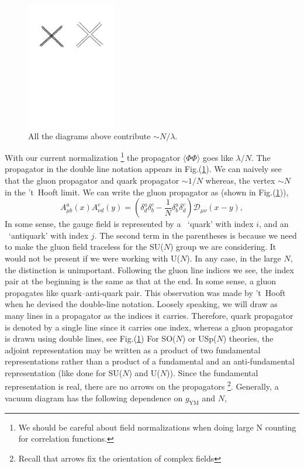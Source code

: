 \begin{figure}
\begin{center}\includegraphics[width=0.35\textwidth]{./Figures/DL3}\end{center}
\caption{\label{fig:dl2}All the diagrams above contribute $\sim N/\lambda$.}
\end{figure}

With our current normalization 
\footnote{We should be careful about field normalizations when doing large N counting for correlation functions. } 
the propagator $\langle \Phi \Phi \rangle$ goes like $\lambda/N$. The propagator in the 
double line notation appears in Fig.(\ref{fig:dl2}). 
We can naively see that the gluon propagator and quark propagator $ \sim 1/N$ 
whereas, the vertex $ \sim N$ in the 't~Hooft limit. 
We can write the gluon propagator as (shown in Fig.(\ref{fig:dl2})), 
\begin{equation}
\label{eq:gluon}
A^{a}_{\mu b}(x) A^{c}_{\nu d}(y) = \left ( \delta^{a}_{d}\delta^{c}_{b} - \frac{1}{N} \delta^{a}_{b}\delta^{c}_{d}\right)
\mathscr{D}_{\mu\nu}(x-y) , 
\end{equation}
In some sense, the gauge field is represented by a ~`quark' with index $i$, and an ~`antiquark' with index $j$. 
The second term in the parentheses is because we need to make the gluon field traceless for the SU($N$) group we are
considering. It would not be present if we were working with U($N$). In any case, in the large $N$, 
the distinction is unimportant. Following the gluon line indices we see, the index pair at the beginning is 
the same as that at the end. In some sense, 
a gluon propagates like quark--anti-quark pair. This observation was made by 't~Hooft when he devised the double-line 
notation. Loosely speaking, we will draw as many lines in a propagator as the indices it carries. Therefore, quark propagator 
is denoted by a single line since it carries one index, whereas a gluon propagator is drawn using double lines, see Fig.(\ref{fig:dl2})
For SO($N$) or USp($N$) theories, the adjoint representation may be written as a product of two fundamental representations 
rather than a product of a fundamental and an anti-fundamental representation (like done for SU($N$) and U($N$)). Since the
fundamental representation is real, there are no arrows on the propagators \footnote{Recall that arrows fix the orientation of complex fields}. Generally, a vacuum diagram has the following dependence on $g_{\text{YM}}$ and $N$, 

